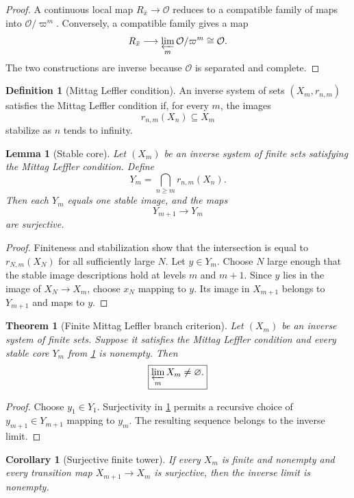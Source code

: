 \documentclass{aomart}
\newtheorem{theorem}{Theorem}[section]
\newtheorem{lemma}[lemma]{Lemma}
\newtheorem{corollary}[corollary]{Corollary}
\theoremstyle{definition}
\newtheorem{definition}[definition]{Definition}
\theoremstyle{remark}
\newcommand{\OO}{\mathcal O}
\begin{document}
\begin{proof}
A continuous local map \(R_{\bar x}\to\OO\) reduces to a compatible family of maps into \(\OO/\varpi^m\). Conversely, a compatible family gives a map
\[
R_{\bar x}
\longrightarrow
\varprojlim_m\OO/\varpi^m
\cong
\OO.
\]
The two constructions are inverse because \(\OO\) is separated and complete.
\end{proof}

\begin{definition}[Mittag Leffler condition]\label{def:ml}
An inverse system of sets \((X_m,r_{n,m})\) satisfies the Mittag Leffler condition if, for every \(m\), the images
\[
r_{n,m}(X_n)
\subseteq
X_m
\]
stabilize as \(n\) tends to infinity.
\end{definition}

\begin{lemma}[Stable core]\label{lem:stable_core}
Let \((X_m)\) be an inverse system of finite sets satisfying the Mittag Leffler condition. Define
\[
Y_m
=
\bigcap_{n\geq m}r_{n,m}(X_n).
\]
Then each \(Y_m\) equals one stable image, and the maps
\[
Y_{m+1}\longrightarrow Y_m
\]
are surjective.
\end{lemma}

\begin{proof}
Finiteness and stabilization show that the intersection is equal to \(r_{N,m}(X_N)\) for all sufficiently large \(N\). Let \(y\in Y_m\). Choose \(N\) large enough that the stable image descriptions hold at levels \(m\) and \(m+1\). Since \(y\) lies in the image of \(X_N\to X_m\), choose \(x_N\) mapping to \(y\). Its image in \(X_{m+1}\) belongs to \(Y_{m+1}\) and maps to \(y\).
\end{proof}

\begin{theorem}[Finite Mittag Leffler branch criterion]\label{thm:finite_ml_branch}
Let \((X_m)\) be an inverse system of finite sets. Suppose it satisfies the Mittag Leffler condition and every stable core \(Y_m\) from \cref{lem:stable_core} is nonempty. Then
\[
\boxed{
\varprojlim_mX_m
\neq
\varnothing.
}
\]
\end{theorem}

\begin{proof}
Choose \(y_1\in Y_1\). Surjectivity in \cref{lem:stable_core} permits a recursive choice of \(y_{m+1}\in Y_{m+1}\) mapping to \(y_m\). The resulting sequence belongs to the inverse limit.
\end{proof}

\begin{corollary}[Surjective finite tower]\label{cor:surjective_finite_tower}
If every \(X_m\) is finite and nonempty and every transition map \(X_{m+1}\to X_m\) is surjective, then the inverse limit is nonempty.
\end{corollary}
\end{document}
